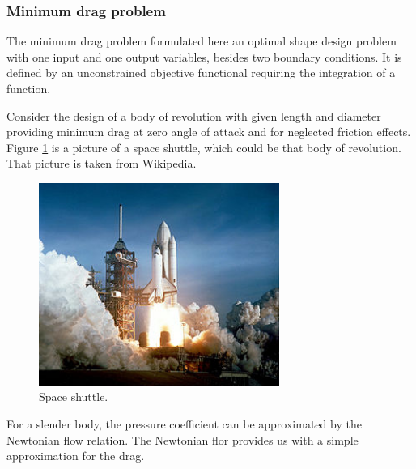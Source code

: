 \subsubsection*{Minimum drag problem}

The minimum drag problem formulated here an optimal shape
design problem with one input and one output variables, besides two boundary conditions. 
It is defined by an unconstrained objective functional requiring the integration of a function. 

Consider the design of a body of revolution with given length and diameter providing minimum drag at zero angle of attack and for neglected friction
effects. 
Figure \ref{SpaceShuttleFigure} is a picture of a space shuttle, which could be that body of revolution. 
That picture is taken from Wikipedia. 

\begin{figure}[h!]
\begin{center}
\includegraphics[width=0.7\textwidth]{optimal_shape_design/space_shuttle}
\caption{Space shuttle.}\label{SpaceShuttleFigure}
\end{center}
\end{figure}

For a slender body, the pressure coefficient can be approximated by the Newtonian flow relation.
The Newtonian flor provides us with a simple approximation for the drag.

